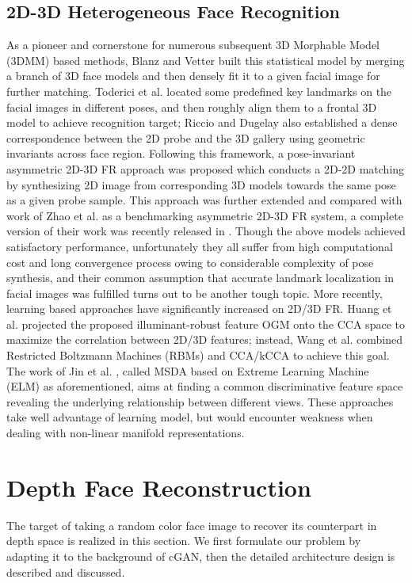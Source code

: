 \documentclass{bmvc2k}
\begin{document}
\subsection{2D-3D Heterogeneous Face Recognition}
As a pioneer and cornerstone for numerous subsequent 3D Morphable Model (3DMM) based methods, Blanz and Vetter \cite{blanz2003face} built this statistical model by merging a branch of 3D face models and then densely fit it to a given facial image for further matching. Toderici et al. \cite{toderici2010bidirectional} located some predefined key landmarks on the facial images in different poses, and then roughly align them to a frontal 3D model to achieve recognition target; Riccio and Dugelay \cite{riccio2007geometric} also established a dense correspondence between the 2D probe and the 3D gallery using geometric invariants across face region. Following this framework, a pose-invariant asymmetric 2D-3D FR approach \cite{zhang20123d} was proposed which conducts a 2D-2D matching by synthesizing 2D image from corresponding 3D models towards the same pose as a given probe sample. This approach was further extended and compared with work of Zhao et al. \cite{zhao2013benchmarking} as a benchmarking asymmetric 2D-3D FR system, a complete version of their work was recently released in \cite{kakadiaris20163d}. Though the above models achieved satisfactory performance, unfortunately they all suffer from high computational cost and long convergence process owing to considerable complexity of pose synthesis, and their common assumption that accurate landmark localization in facial images was fulfilled turns out to be another tough topic. More recently, learning based approaches have significantly increased on 2D/3D FR. Huang et al. \cite{huang2012oriented} projected the proposed illuminant-robust feature OGM onto the CCA space to maximize the correlation between 2D/3D features; instead, Wang et al. \cite{wang20142d} combined Restricted Boltzmann Machines (RBMs) and CCA/kCCA to achieve this goal. The work of Jin et al. \cite{jin2014cross}, called MSDA based on Extreme Learning Machine (ELM) as aforementioned, aims at finding a common discriminative feature space revealing the underlying relationship between different views. These approaches take well advantage of learning model, but would encounter weakness when dealing with non-linear manifold representations.

\section{Depth Face Reconstruction}
The target of taking a random color face image to recover its counterpart in depth space is realized in this section. We first formulate our problem by adapting it to the background of cGAN, then the detailed architecture design is described and discussed.
\end{document}
